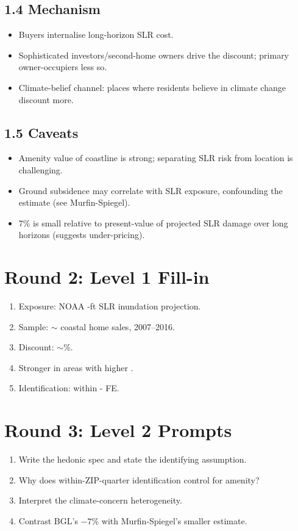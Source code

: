 \documentclass[11pt]{article}
\newcommand{\blank}[1]{\underline{\hspace{#1}}}
\begin{document}
\subsection*{1.4 Mechanism}
\begin{itemize}
\item Buyers internalise long-horizon SLR cost.
\item Sophisticated investors/second-home owners drive the discount; primary owner-occupiers less so.
\item Climate-belief channel: places where residents believe in climate change discount more.
\end{itemize}

\subsection*{1.5 Caveats}
\begin{alertbox}
\begin{itemize}
\item Amenity value of coastline is strong; separating SLR risk from location is challenging.
\item Ground subsidence may correlate with SLR exposure, confounding the estimate (see Murfin-Spiegel).
\item 7\% is small relative to present-value of projected SLR damage over long horizons (suggests under-pricing).
\end{itemize}
\end{alertbox}

\section*{Round 2: Level 1 Fill-in}
\begin{enumerate}
\item Exposure: NOAA \blank{1cm}-ft SLR inundation projection.
\item Sample: $\sim$\blank{3cm} coastal home sales, 2007--2016.
\item Discount: $\sim$\blank{1cm}\%.
\item Stronger in areas with higher \blank{1.5cm}.
\item Identification: within \blank{1cm}-\blank{1cm} FE.
\end{enumerate}

\section*{Round 3: Level 2 Prompts}
\begin{enumerate}
\item Write the hedonic spec and state the identifying assumption.
\item Why does within-ZIP-quarter identification control for amenity?
\item Interpret the climate-concern heterogeneity.
\item Contrast BGL's $-7\%$ with Murfin-Spiegel's smaller estimate.
\end{enumerate}
\end{document}
